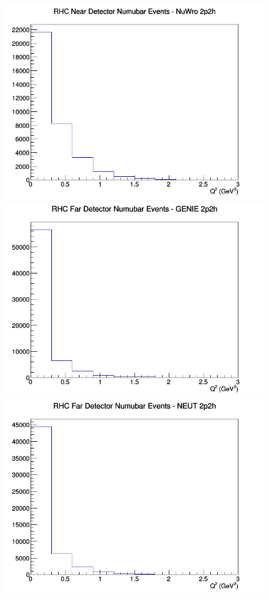 \begin{figure}[h]
\includegraphics[width=\linewidth]{eff_Q2/LAr/2p2h_RHC_ND_numubar_Q2_NuWro.png}
\endminipage
\newline
{}
\includegraphics[width=\linewidth]{eff_Q2/LAr/2p2h_RHC_FD_numubar_Q2_GENIE.png}
\endminipage
{}
\includegraphics[width=\linewidth]{eff_Q2/LAr/2p2h_RHC_FD_numubar_Q2_NEUT.png}

\end{figure}
